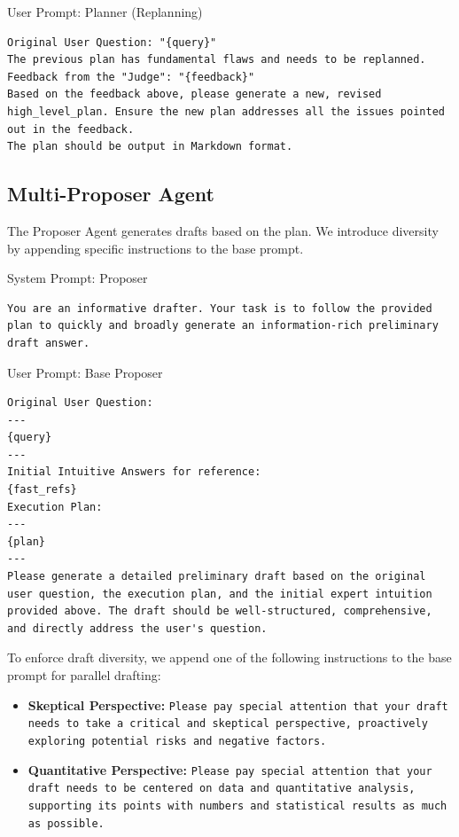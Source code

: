 \documentclass{article}
\begin{document}
\begin{promptbox}[colback=violet!5,colframe=violet!35!gray,colbacktitle=violet!55]{User Prompt: Planner (Replanning)}
\begin{lstlisting}
Original User Question: "{query}"
The previous plan has fundamental flaws and needs to be replanned.
Feedback from the "Judge": "{feedback}"
Based on the feedback above, please generate a new, revised high_level_plan. Ensure the new plan addresses all the issues pointed out in the feedback.
The plan should be output in Markdown format.
\end{lstlisting}
\end{promptbox}


\subsection{Multi-Proposer Agent}
The Proposer Agent generates drafts based on the plan. We introduce diversity by appending specific instructions to the base prompt.

\begin{promptbox}[colback=orange!5,colframe=orange!35!gray,colbacktitle=orange!55]{System Prompt: Proposer}
\begin{lstlisting}
You are an informative drafter. Your task is to follow the provided plan to quickly and broadly generate an information-rich preliminary draft answer.
\end{lstlisting}
\end{promptbox}

\begin{promptbox}[colback=orange!5,colframe=orange!35!gray,colbacktitle=orange!55]{User Prompt: Base Proposer}
\begin{lstlisting}
Original User Question:
---
{query}
---
Initial Intuitive Answers for reference:
{fast_refs}
Execution Plan:
---
{plan}
---
Please generate a detailed preliminary draft based on the original user question, the execution plan, and the initial expert intuition provided above. The draft should be well-structured, comprehensive, and directly address the user's question.
\end{lstlisting}
\end{promptbox}

To enforce draft diversity, we append one of the following instructions to the base prompt for parallel drafting:
\begin{itemize}[nosep, leftmargin=1.5em]
    \item \textbf{Skeptical Perspective:} \texttt{Please pay special attention that your draft needs to take a critical and skeptical perspective, proactively exploring potential risks and negative factors.}
    \item \textbf{Quantitative Perspective:} \texttt{Please pay special attention that your draft needs to be centered on data and quantitative analysis, supporting its points with numbers and statistical results as much as possible.}
\end{itemize}
\end{document}
